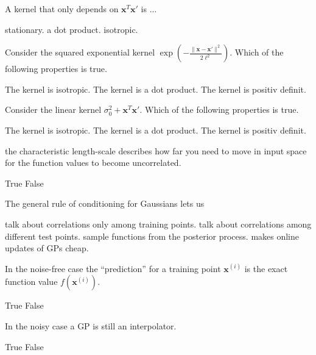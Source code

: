 \documentclass{exam}
\newcommand{\xI}[1]{\mathbf{x}^{(#1)}}
\newcommand{\ls}{\ell}
\newcommand{\x}[0]{\mathbf{x}}
\newcommand{\variance}{\sigma^2}
\begin{document}
\begin{questions}
		\question A kernel that only depends on $\x^{T}\x'$ is ...
		\begin{choices}
			\choice stationary.
			\choice a dot product. %
			\choice isotropic.
		\end{choices}
		
		\question Consider the squared exponential kernel $\exp(- \frac{\|\x - \x'\|^2}{2\ls^2})$. Which of the following properties is true.
		\begin{choices}
			\choice The kernel is isotropic. %
			\choice The kernel is a dot product.
			\choice The kernel is positiv definit. %
		\end{choices}
		
		\question Consider the linear kernel $\variance_0 + \x^T\x'$. Which of the following properties is true.
		\begin{choices}
			\choice The kernel is isotropic.
			\choice The kernel is a dot product. %
			\choice The kernel is positiv definit.
		\end{choices}
		
		\question the characteristic length-scale
		describes how far you need to move in input space for the function values to become
		uncorrelated.
		\begin{choices}
			\choice True %
			\choice False
		\end{choices}
		
		\question The general rule of conditioning for Gaussians lets us
		\begin{choices}
			\choice talk about correlations only among training points.
			\choice talk about correlations among different test points. %
			\choice sample functions from the posterior process. %
			\choice makes online updates of GPs cheap.
		\end{choices}
		
		\question In the noise-free case the  ``prediction'' for a training point $\xI{i}$ is the exact function value $f(\xI{i})$.
		\begin{choices}
			\choice True %
			\choice False
		\end{choices}
		
		\question In the noisy case a GP is still an interpolator. %
		\begin{choices}
			\choice True
			\choice False %
		\end{choices}
		

\end{questions}
\end{document}
